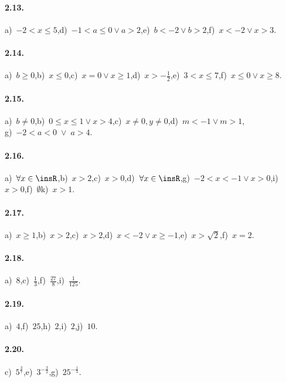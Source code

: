 \paragraph{2.13.}
a)~$-2<x\le 5$,\quad d)~$-1<a\le 0 \vee a>2$,\quad e)~$b<-2\vee b>2$,\quad f)~$x<-2\vee x>3$.

\paragraph{2.14.}
a)~$b\ge 0$,\quad b)~$x\le 0$,\quad c)~$x=0\vee x\ge 1$,\quad d)~$x>-\frac{1}{2}$,\quad e)~$3<x\le 7$,\quad f)~$x\le 0 \vee x\ge 8$.

\paragraph{2.15.}
a)~$b\neq 0$,\quad b)~$0\le x\le 1\vee x>4$,\quad c)~$x\neq 0, y\neq 0$,\quad d)~$m<-1 \vee m>1$,\protect\\ g)~$-2<a<0\;\vee \;a>4$.

\paragraph{2.16.}
a)~$\forall x\in \insR$,\quad b)~$x>2$,\quad c)~$x>0$,\quad d)~$\forall x\in \insR$,\quad g)~$-2<x<-1 \vee x>0$,\quad i)~$x>0$,\quad f)~$\emptyset$\quad k)~$x>1$.

\paragraph{2.17.}
a)~$x \ge 1$,\quad b)~$x>2$,\quad c)~$x>2$,\quad d)~$x<-2 \vee x\ge -1$,\quad e)~$x>\sqrt{2}$,\quad f)~$x=2$.

\paragraph{2.18.}
a)~$8$,\quad c)~$\frac{1}{3}$,\quad f)~$\frac{27}{8}$,\quad i)~$\frac{1}{125}$.

\paragraph{2.19.}
a)~$4$,\quad f)~$25$,\quad h)~$2$,\quad i)~$2$,\quad j)~$10$.

\paragraph{2.20.}
c)~$5^{\frac 3 7}$,\quad e)~$3^{-\frac 3 2}$,\quad g)~$25^{-\frac 1 3}$.

